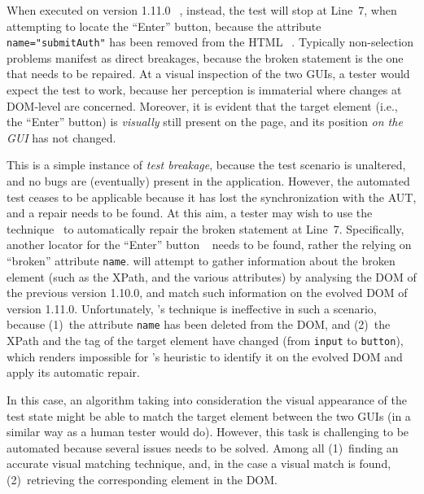 When executed on version 1.11.0~\textcircled{}, instead, the test will stop at Line~7, when attempting to locate the ``Enter'' button, because the attribute \mbox{\texttt{name="submitAuth"}} has been removed from the HTML~\textcircled{}. Typically non-selection problems manifest as direct breakages, because the broken statement is the one that needs to be repaired.  
%
At a visual inspection of the two GUIs, a tester would expect the test to work, because her perception is immaterial where changes at DOM-level are concerned. Moreover, it is evident that the target element (i.e., the ``Enter'' button) is \textit{visually} still present on the page, and its position \textit{on the GUI} has not changed.
 
This is a simple instance of \textit{test breakage}, because the test scenario is unaltered, and no bugs are (eventually) present in the application. However, the automated test ceases to be applicable because it has lost the synchronization with the AUT, and a repair needs to be found.
At this aim, a tester may wish to use the \water  technique~\cite{Choudhary:2011:WWA:2002931.2002935} to automatically repair the broken statement at Line~7. Specifically, another locator for the ``Enter'' button~\textcircled{} needs to be found, rather the relying on ``broken'' attribute \texttt{name}. \water will attempt to gather information about the broken element (such as the XPath, and the various attributes) by analysing the DOM of the previous version 1.10.0, and match such information on the evolved DOM of version 1.11.0. Unfortunately, \water's technique is ineffective in such a scenario, because (1)~the attribute \texttt{name} has been deleted from the DOM, and (2)~the XPath and the tag of the target element have changed (from \mbox{\texttt{input}} to \mbox{\texttt{button}}), which renders impossible for \water's heuristic to identify it on the evolved DOM and apply its automatic repair.
 
In this case, an algorithm taking into consideration the visual appearance of the test state might be able to match the target element between the two GUIs (in a similar way as a human tester would do). However, this task is challenging to be automated because several issues needs to be solved. Among all (1)~finding an accurate visual matching technique, and, in the case a visual match is found, (2)~retrieving the corresponding element in the DOM. 


